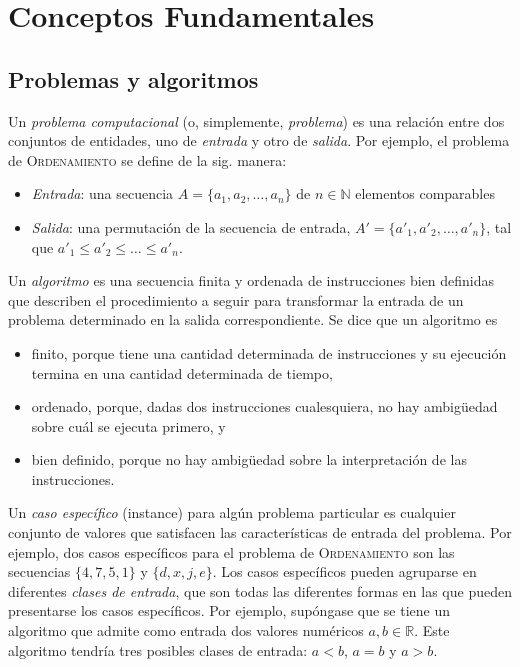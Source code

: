 
\chapter{Conceptos Fundamentales}

\section{Problemas y algoritmos}

Un \emph{problema computacional} (o, simplemente, \emph{problema})
es una relación entre dos conjuntos de entidades, uno de \emph{entrada}
y otro de \emph{salida}. Por ejemplo, el problema de \textsc{Ordenamiento} se
define de la sig. manera:

\begin{itemize}
    \item \emph{Entrada}: una secuencia $A=\{a_1,a_2,\dots,a_n\}$ de $n\in\mathbb{N}$ elementos comparables
    \item \emph{Salida}: una permutación de la secuencia de entrada, $A'=\{a'_1,a'_2,\dots,a'_n\}$, tal que $a'_1\leq a'_2\leq\dots\leq a'_n$.
\end{itemize}

Un \emph{algoritmo} es una secuencia finita
y ordenada de instrucciones bien definidas que describen el procedimiento
a seguir para transformar la entrada de un problema determinado en
la salida correspondiente. Se dice que un algoritmo es

\begin{itemize}
    \item finito, porque tiene una cantidad determinada de instrucciones y su
    ejecución termina en una cantidad determinada de tiempo,
    \item ordenado, porque, dadas dos instrucciones cualesquiera, no hay ambigüedad
    sobre cuál se ejecuta primero, y
    \item bien definido, porque no hay ambigüedad sobre la interpretación de
    las instrucciones.
\end{itemize}

Un \emph{caso específico} (instance) para algún problema particular
es cualquier conjunto de valores que satisfacen las características
de entrada del problema. Por ejemplo, dos casos específicos para el problema
de \textsc{Ordenamiento} son las secuencias $\{4,7,5,1\}$ y $\{d,x,j,e\}$. Los casos específicos pueden agruparse en
diferentes \emph{clases de entrada}, que son todas las diferentes
formas en las que pueden presentarse los casos específicos. Por ejemplo,
supóngase que se tiene un algoritmo que admite como entrada dos valores
numéricos $a,b\in\mathbb{R}$. Este algoritmo tendría tres posibles
clases de entrada: $a<b$, $a=b$ y $a>b$.

